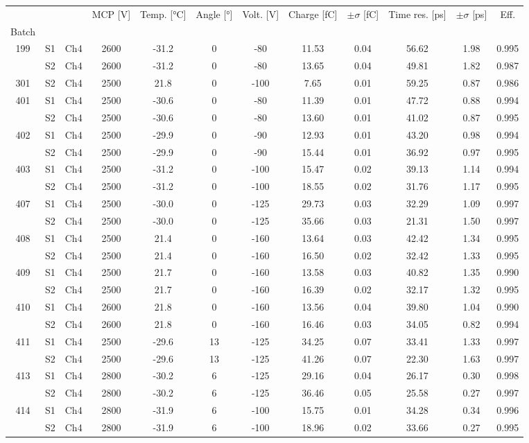\begin{tabular}{cccccccccccc}
\toprule
 &  &  & MCP [V] & Temp. [°C] & Angle [°] & Volt. [V] & Charge [fC] & \(\pm\sigma\) [fC] & Time res. [ps] & \(\pm\sigma\) [ps] & Eff. \\
Batch &  &  &  &  &  &  &  &  &  &  &  \\
\midrule
199 & S1 & Ch4 & 2600 & -31.2 & 0 & -80 & 11.53 & 0.04 & 56.62 & 1.98 & 0.995 \\
 & S2 & Ch4 & 2600 & -31.2 & 0 & -80 & 13.65 & 0.04 & 49.81 & 1.82 & 0.987 \\
301 & S2 & Ch4 & 2500 & 21.8 & 0 & -100 & 7.65 & 0.01 & 59.25 & 0.87 & 0.986 \\
401 & S1 & Ch4 & 2500 & -30.6 & 0 & -80 & 11.39 & 0.01 & 47.72 & 0.88 & 0.994 \\
 & S2 & Ch4 & 2500 & -30.6 & 0 & -80 & 13.60 & 0.01 & 41.02 & 0.87 & 0.995 \\
402 & S1 & Ch4 & 2500 & -29.9 & 0 & -90 & 12.93 & 0.01 & 43.20 & 0.98 & 0.994 \\
 & S2 & Ch4 & 2500 & -29.9 & 0 & -90 & 15.44 & 0.01 & 36.92 & 0.97 & 0.995 \\
403 & S1 & Ch4 & 2500 & -31.2 & 0 & -100 & 15.47 & 0.02 & 39.13 & 1.14 & 0.994 \\
 & S2 & Ch4 & 2500 & -31.2 & 0 & -100 & 18.55 & 0.02 & 31.76 & 1.17 & 0.995 \\
407 & S1 & Ch4 & 2500 & -30.0 & 0 & -125 & 29.73 & 0.03 & 32.29 & 1.09 & 0.997 \\
 & S2 & Ch4 & 2500 & -30.0 & 0 & -125 & 35.66 & 0.03 & 21.31 & 1.50 & 0.997 \\
408 & S1 & Ch4 & 2500 & 21.4 & 0 & -160 & 13.64 & 0.03 & 42.42 & 1.34 & 0.995 \\
 & S2 & Ch4 & 2500 & 21.4 & 0 & -160 & 16.50 & 0.02 & 32.42 & 1.33 & 0.995 \\
409 & S1 & Ch4 & 2500 & 21.7 & 0 & -160 & 13.58 & 0.03 & 40.82 & 1.35 & 0.990 \\
 & S2 & Ch4 & 2500 & 21.7 & 0 & -160 & 16.39 & 0.02 & 32.17 & 1.32 & 0.995 \\
410 & S1 & Ch4 & 2600 & 21.8 & 0 & -160 & 13.56 & 0.04 & 39.80 & 1.04 & 0.990 \\
 & S2 & Ch4 & 2600 & 21.8 & 0 & -160 & 16.46 & 0.03 & 34.05 & 0.82 & 0.994 \\
411 & S1 & Ch4 & 2500 & -29.6 & 13 & -125 & 34.25 & 0.07 & 33.41 & 1.33 & 0.997 \\
 & S2 & Ch4 & 2500 & -29.6 & 13 & -125 & 41.26 & 0.07 & 22.30 & 1.63 & 0.997 \\
413 & S1 & Ch4 & 2800 & -30.2 & 6 & -125 & 29.16 & 0.04 & 26.17 & 0.30 & 0.998 \\
 & S2 & Ch4 & 2800 & -30.2 & 6 & -125 & 36.46 & 0.05 & 25.58 & 0.27 & 0.997 \\
414 & S1 & Ch4 & 2800 & -31.9 & 6 & -100 & 15.75 & 0.01 & 34.28 & 0.34 & 0.996 \\
 & S2 & Ch4 & 2800 & -31.9 & 6 & -100 & 18.96 & 0.02 & 33.66 & 0.27 & 0.995 \\
\bottomrule
\end{tabular}
